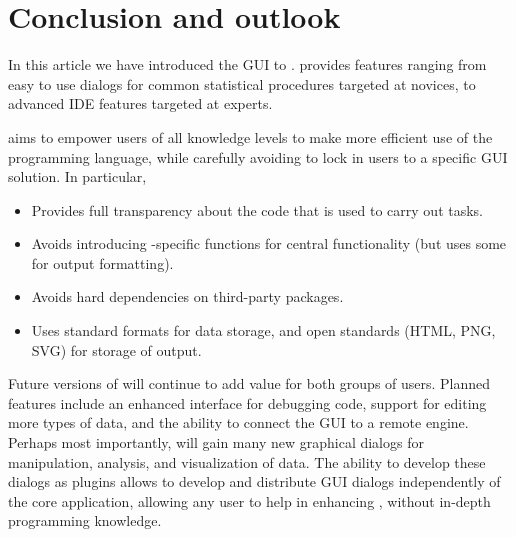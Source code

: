 \section{Conclusion and outlook}
\label{sec:conclusion_summary}
In this article we have introduced the  GUI to .  provides features ranging
from easy to use dialogs for common statistical procedures targeted at  novices, to advanced
IDE features targeted at  experts.

 aims to empower users of all knowledge levels to make more efficient use of the 
 programming language, while carefully avoiding to lock in users to a specific
GUI solution. In particular, 
\begin{itemize}
 \item Provides full transparency about the  code that is used to carry out tasks.
 \item Avoids introducing -specific  functions for central functionality (but uses some for output formatting).
 \item Avoids hard dependencies on third-party  packages.
 \item Uses standard  formats \citep[see][]{RDCT2010c} for data storage, and open standards (HTML, PNG, SVG) for storage of output.
\end{itemize}

Future versions of  will continue to add value for both groups of users. Planned features include
an enhanced interface for debugging  code, support for editing more types of data, and the
ability to connect the  GUI to a remote  engine. Perhaps most importantly,  will
gain many new graphical dialogs for manipulation, analysis, and visualization of data. The ability to
develop these dialogs as plugins allows to develop and distribute GUI dialogs
independently of the  core application, allowing any user to help in enhancing , without in-depth
programming knowledge.

